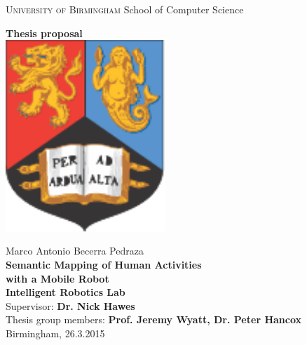 

\begin{titlepage}
\begin{center}

   {\Large \textsc{University of Birmingham}}
	\vskip 10pt
	{\Large \sc School of Computer Science}

\vspace{50pt}
{\Huge\bf Thesis proposal }\\
\vspace{40pt}
\includegraphics[width=6cm]{fig/uob_coat.pdf}

\vspace{40pt}
{\Large\rm Marco Antonio Becerra Pedraza} \\
\vspace{20pt}
{\Large\bf Semantic Mapping of Human Activities}\\
\vspace{0.2cm}
{\Large\bf with a Mobile Robot}\\

\vspace{40pt}
{\bf Intelligent Robotics Lab}\\
\vspace{5pt}   
{Supervisor: {\bf Dr. Nick Hawes}}\\
\vspace{5pt}   
{Thesis group members: {\bf Prof. Jeremy Wyatt, Dr. Peter Hancox}}
\vfill 
{Birmingham, 26.3.2015}
\end{center}
\end{titlepage}